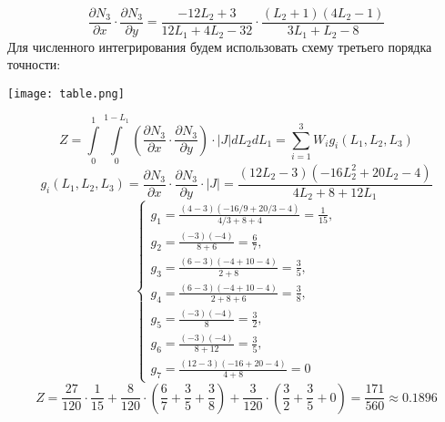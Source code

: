 \documentclass[a4paper, 12pt]{article}
\begin{document}
\begin{enumerate}
\[
    \frac{\partial N_3}{\partial x} \cdot \frac{\partial N_3}{\partial y} = 
    \frac{-12L_2 + 3}{12L_1+4L_2-32} \cdot \frac{(L_2+1)(4L_2 - 1)}{3L_1+L_2-8}
\]
Для численного интегрирования будем использовать схему третьего порядка точности:
\begin{center}
    \texttt{[image: table.png]}
\end{center}
\[
    Z = \int \limits_0^1 \int \limits_0^{1-L_1} \left ( \frac{\partial N_3}{\partial x} \cdot \frac{\partial N_3}{\partial y} \right ) \cdot |J| dL_2 dL_1 =
    \sum \limits_{i=1}^3 W_i g_i (L_1, L_2, L_3)
\]
\[
    g_i (L_1, L_2, L_3) = \frac{\partial N_3}{\partial x} \cdot \frac{\partial N_3}{\partial y} \cdot |J| =
    \frac{(12L_2-3)(-16L_2^2+20L_2-4)}{4L_2 + 8 + 12L_1}
\]
\[
    \begin{cases}
        g_1 = \frac{(4-3)(-16/9+20/3-4)}{4/3 + 8 + 4} = \frac{1}{15},\\
        g_2 = \frac{(-3)(-4)}{8 + 6} = \frac{6}{7},\\
        g_3 = \frac{(6-3)(-4+10-4)}{2 + 8} = \frac{3}{5},\\
        g_4 = \frac{(6-3)(-4+10-4)}{2 + 8 + 6} = \frac{3}{8},\\
        g_5 = \frac{(-3)(-4)}{8} = \frac{3}{2},\\
        g_6 = \frac{(-3)(-4)}{8 + 12} = \frac{3}{5},\\
        g_7 = \frac{(12-3)(-16+20-4)}{4 + 8} = 0
    \end{cases}
\]
\[
    Z = \frac{27}{120} \cdot \frac{1}{15} + \frac{8}{120} \cdot 
    \left(\frac{6}{7} + \frac{3}{5} + \frac{3}{8}\right) +
    \frac{3}{120} \cdot 
    \left(\frac{3}{2} + \frac{3}{5} + 0\right) = \frac{171}{560} \approx 0.1896
\]


\end{enumerate}
\end{document}
